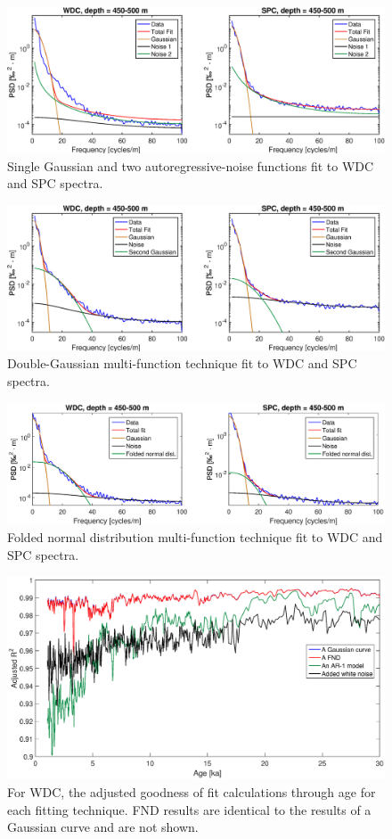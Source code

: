 \documentclass[draft, jgrga]{AGUTeX}
\begin{document}
\begin{figure}
\includegraphics[width=.9\linewidth]{GRR_fits.eps}
\caption{Single Gaussian and two autoregressive-noise functions fit to WDC and SPC spectra.}\label{GRR_fits}
\end{figure}

\begin{figure}
\includegraphics[width=.9\linewidth]{GGR_fits.eps}
\caption{Double-Gaussian multi-function technique fit to WDC and SPC spectra.}\label{GGR_fits}
\end{figure}

\begin{figure}
	\includegraphics[width=1.1\linewidth]{folded_normal_gauss_spectrum.eps}
	\caption{Folded normal distribution multi-function technique fit to WDC and SPC spectra.}\label{folded_normal_gauss_spectrum}
\end{figure}

\begin{figure}
	\includegraphics[width=.9\linewidth]{G_of_fit_1.eps}
	\caption{For WDC, the adjusted goodness of fit calculations through age for each fitting technique. FND results are identical to the results of a Gaussian curve and are not shown.} \label{G_of_fit_1}
\end{figure}
\end{document}
